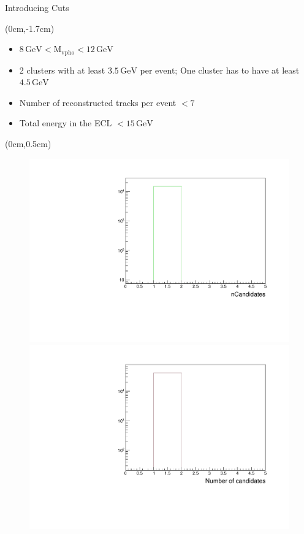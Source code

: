 \documentclass[8pt]{beamer}
\begin{document}
\begin{frame}{Introducing Cuts}
	\begin{textblock*}{11cm}(0cm,-1.7cm)
	\begin{itemize}
		\item<3-> $8\,\textrm{GeV} < \textrm{M}_{\textrm{vpho}} < 12\,\textrm{GeV}$
		\item<3-> 2 clusters with at least $3.5\,\textrm{GeV}$ per event; One cluster has to have at least $4.5\,\textrm{GeV}$
		\item<3-> Number of reconstructed tracks per event $< 7$
		\item<3-> Total energy in the ECL $< 15\,\textrm{GeV}$
	\end{itemize}

\end{textblock*}

\begin{textblock*}{11cm}(0cm,0.5cm)
\begin{figure}[h!]
	\centering
	\pause[4]
	\begin{minipage}[b]{0.45\linewidth}
		\centering
		\includegraphics[width=\textwidth]{VBilder/nCandNoMCInfo.pdf}
	\end{minipage}
	\hspace{0.5cm}
	\pause[5]
	\begin{minipage}[b]{0.45\linewidth}
		\centering
		\includegraphics[width=\textwidth]{VBilder/nCandData.pdf}
	\end{minipage}
	

\end{figure}
\end{textblock*}
\end{frame}
\end{document}
